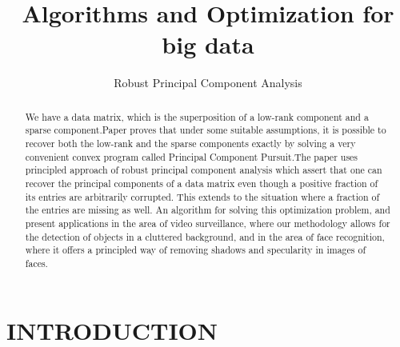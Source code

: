 \documentclass[letterpaper, 10 pt, conference]{ieeeconf}  %
\title{
\LARGE \bf
Algorithms and Optimization for big data
}
\author{Robust Principal Component Analysis%
}
\begin{document}
\maketitle
\thispagestyle{empty}
\pagestyle{empty}


\begin{abstract}
We have a data matrix, which is the superposition of a
low-rank component and a sparse component.Paper proves that under some suitable assumptions, it is possible to recover both the low-rank and the sparse components exactly by solving a very convenient convex program called Principal Component Pursuit.The paper uses principled approach of robust principal component analysis which assert that one can recover the principal components of a data matrix even though a positive fraction of its entries are arbitrarily corrupted. This extends to the situation where a fraction of the entries are missing as well. An algorithm for solving this optimization problem, and present applications in the area of video surveillance, where our methodology allows for the detection of objects in a cluttered background, and in the area of face recognition, where it offers a principled way of removing shadows and specularity in images of faces.
\end{abstract}


\section{INTRODUCTION}
\end{document}
